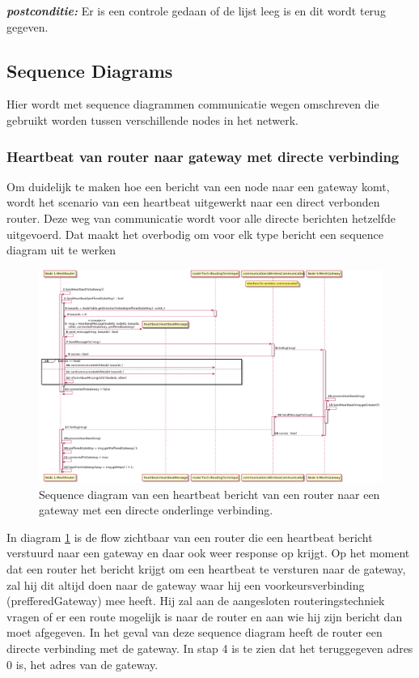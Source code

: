 \documentclass[a4paper, 11pt, oneside]{report}
\begin{document}
\textbf{\textit{postconditie:}} Er is een controle gedaan of de lijst leeg is en dit wordt terug gegeven.

\subsection{Sequence Diagrams}
\label{DetailedDesign:Communicatie:sequence}
Hier wordt met sequence diagrammen communicatie wegen omschreven die gebruikt worden tussen verschillende nodes in het netwerk.

\subsubsection{Heartbeat van router naar gateway met directe verbinding}
\label{DetailedDesign:Communicatie:sequence:heartbeatrouter->gateway}
Om duidelijk te maken hoe een bericht van een node naar een gateway komt, wordt het scenario van een heartbeat uitgewerkt naar een direct verbonden router.
Deze weg van communicatie wordt voor alle directe berichten hetzelfde uitgevoerd.
Dat maakt het overbodig om voor elk type bericht een sequence diagram uit te werken
\begin{figure}[H]
	\begin{center}\includegraphics[width=.97\linewidth]{UML/out/Communication/Sequence/RouterDirectNaarGatewayHeartbeat/RouterDirectNaarGatewayHeartbeat.png}\end{center}
	\caption{Sequence diagram van een heartbeat bericht van een router naar een gateway met een directe onderlinge verbinding.}
	\label{fig:communication:sequence:sequence:heartbeatrouter->gateway}
\end{figure}
In diagram \ref{fig:communication:sequence:sequence:heartbeatrouter->gateway} is de flow zichtbaar van een router die een heartbeat bericht verstuurd naar een gateway en daar ook weer response op krijgt.
Op het moment dat een router het bericht krijgt om een heartbeat te versturen naar de gateway, zal hij dit altijd doen naar de gateway waar hij een voorkeursverbinding (prefferedGateway) mee heeft.
Hij zal aan de aangesloten routeringstechniek vragen of er een route mogelijk is naar de router en aan wie hij zijn bericht dan moet afgegeven.
In het geval van deze sequence diagram heeft de router een directe verbinding met de gateway. In stap 4 is te zien dat het teruggegeven adres 0 is, het adres van de gateway.
\end{document}
